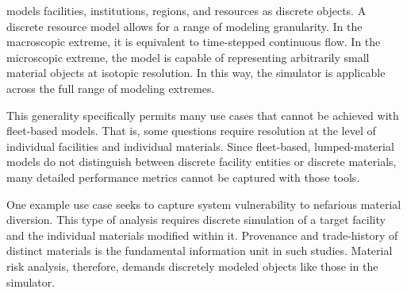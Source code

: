 \Cyclus models facilities, institutions, regions, and resources as discrete 
objects. A discrete resource model allows for a range of modeling granularity. In the
macroscopic extreme, it is equivalent to time-stepped continuous flow. In the
microscopic extreme, the model is capable of representing arbitrarily small 
material objects at isotopic resolution. In this way, the \Cyclus simulator is 
applicable across the full range of modeling extremes. 

This generality specifically permits many use cases that cannot be achieved with 
fleet-based models. That is, some questions require resolution at the level of 
individual facilities and individual materials.  Since fleet-based, 
lumped-material models do not distinguish between discrete facility entities or 
discrete materials, many detailed performance metrics cannot be captured with 
those tools. 

One example use case seeks to capture system vulnerability to nefarious 
material diversion. This type of analysis requires discrete simulation of a 
target facility and the individual materials modified within it. 
Provenance and trade-history of distinct materials is the fundamental 
information unit in such studies. 
Material risk analysis, therefore, demands discretely modeled objects like those 
in the \Cyclus simulator.


